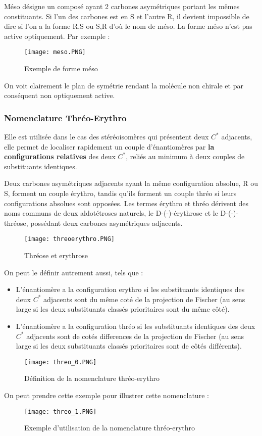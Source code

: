 \documentclass[a4paper, oneside]{book}
\begin{document}
Méso désigne un composé ayant 2 carbones asymétriques portant les mêmes constituants. Si l'un des carbones est en S et l'autre R, il devient impossible de dire si l'on a la forme R,S ou S,R d'où le nom de méso. La forme méso n'est pas active optiquement. Par exemple :
\begin{figure}[!h]
    \centering
    \texttt{[image: meso.PNG]}
    \caption{Exemple de forme méso}
    \label{fig:my_label}
\end{figure}

On voit clairement le plan de symétrie rendant la molécule non chirale et par conséquent non optiquement active.
\subsubsection{Nomenclature Thréo-Erythro}
Elle est utilisée dans le cas des stéréoisomères qui présentent deux $C^*$ adjacents, elle permet de localiser rapidement un couple d'énantiomères par \textbf{la configurations relatives} des deux $C^*$, reliés au minimum à deux couples de substituants identiques.

Deux carbones asymétriques adjacents ayant la même configuration absolue, R ou S, forment un couple érythro, tandis qu'ils forment un couple thréo si leurs configurations absolues sont opposées. Les termes érythro et thréo dérivent des noms communs de deux aldotétroses naturels, le D-(-)-érythrose et le D-(-)-thréose, possédant deux carbones asymétriques adjacents.
\begin{figure}[!h]
    \centering
    \texttt{[image: threoerythro.PNG]}
    \caption{Thréose et erythrose}
    \label{fig:my_label}
\end{figure}

On peut le définir autrement aussi, tels que :
\begin{itemize}
    \item L'énantiomère a la configuration erythro si les substituants identiques des deux $C^*$ adjacents sont du même coté de la projection de Fischer (au sens large si les deux substituants classés prioritaires sont du même côté).
    \item L'énantiomère a la configuration thréo si les substituants identiques des deux $C^*$ adjacents sont de cotés differences de la projection de Fischer (au sens large si les deux substituants classés prioritaires sont de côtés différents).
\end{itemize}
\begin{figure}[!h]
    \centering
    \texttt{[image: threo\_0.PNG]}
    \caption{Définition de la nomenclature thréo-erythro}
    \label{fig:my_label}
\end{figure}
\newpage
On peut prendre cette exemple pour illustrer cette nomenclature :
\begin{figure}[!h]
    \centering
    \texttt{[image: threo\_1.PNG]}
    \caption{Exemple d'utilisation de la nomenclature thréo-erythro}
    \label{fig:my_label}
\end{figure}
\end{document}
